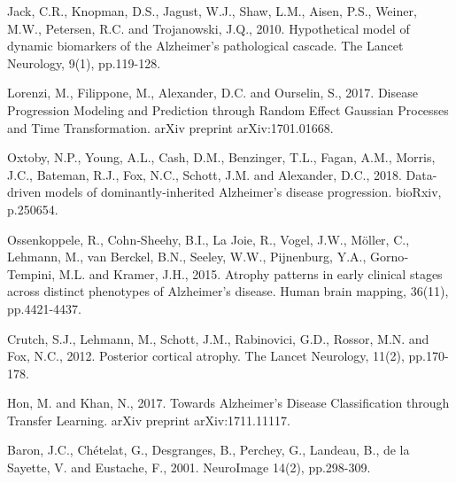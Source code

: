 \documentclass{llncs}
\begin{document}
%


\begin{thebibliography}{5}

Jack, C.R., Knopman, D.S., Jagust, W.J., Shaw, L.M., Aisen, P.S., Weiner, M.W., Petersen, R.C. and Trojanowski, J.Q., 2010. Hypothetical model of dynamic biomarkers of the Alzheimer's pathological cascade. The Lancet Neurology, 9(1), pp.119-128.

Lorenzi, M., Filippone, M., Alexander, D.C. and Ourselin, S., 2017. Disease Progression Modeling and Prediction through Random Effect Gaussian Processes and Time Transformation. arXiv preprint arXiv:1701.01668.


Oxtoby, N.P., Young, A.L., Cash, D.M., Benzinger, T.L., Fagan, A.M., Morris, J.C., Bateman, R.J., Fox, N.C., Schott, J.M. and Alexander, D.C., 2018. Data-driven models of dominantly-inherited Alzheimer's disease progression. bioRxiv, p.250654.

Ossenkoppele, R., Cohn‐Sheehy, B.I., La Joie, R., Vogel, J.W., Möller, C., Lehmann, M., van Berckel, B.N., Seeley, W.W., Pijnenburg, Y.A., Gorno‐Tempini, M.L. and Kramer, J.H., 2015. Atrophy patterns in early clinical stages across distinct phenotypes of Alzheimer's disease. Human brain mapping, 36(11), pp.4421-4437.

Crutch, S.J., Lehmann, M., Schott, J.M., Rabinovici, G.D., Rossor, M.N. and Fox, N.C., 2012. Posterior cortical atrophy. The Lancet Neurology, 11(2), pp.170-178.

Hon, M. and Khan, N., 2017. Towards Alzheimer's Disease Classification through Transfer Learning. arXiv preprint arXiv:1711.11117.

Baron, J.C., Ch\'{e}telat, G., Desgranges, B., Perchey, G., Landeau, B., {de la Sayette}, V. and Eustache, F., 2001. NeuroImage 14(2), pp.298-309.

\end{thebibliography}

\clearpage
\end{document}

